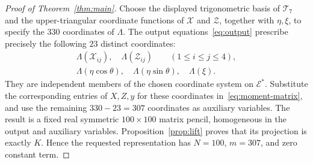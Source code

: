 \begin{proof}[Proof of Theorem~\ref{thm:main}]
Choose the displayed trigonometric basis of $\mathcal T_7$ and the
upper-triangular coordinate functions of $\mathcal X$ and $\mathcal Z$,
together with $\eta,\xi$, to specify the $330$ coordinates of $\Lambda$.
The output equations~\eqref{eq:output} prescribe precisely the following
$23$ distinct coordinates:
\begin{gather*}
  \Lambda(\mathcal X_{ij}),\quad
  \Lambda(\mathcal Z_{ij})\qquad(1\leq i\leq j\leq4),\\
  \Lambda(\eta\cos\theta),\quad
  \Lambda(\eta\sin\theta),\quad
  \Lambda(\xi).
\end{gather*}
They are independent members of the chosen coordinate system on
$\mathcal E^*$.  Substitute the corresponding entries of $X,Z,y$ for
these coordinates in~\eqref{eq:moment-matrix}, and use the remaining
$330-23=307$ coordinates as auxiliary variables.  The result is a fixed
real symmetric $100\times100$ matrix pencil, homogeneous in the output
and auxiliary variables.  Proposition~\ref{prop:lift} proves that its
projection is exactly $K$.  Hence the requested representation has
$N=100$, $m=307$, and zero constant term.
\end{proof}
